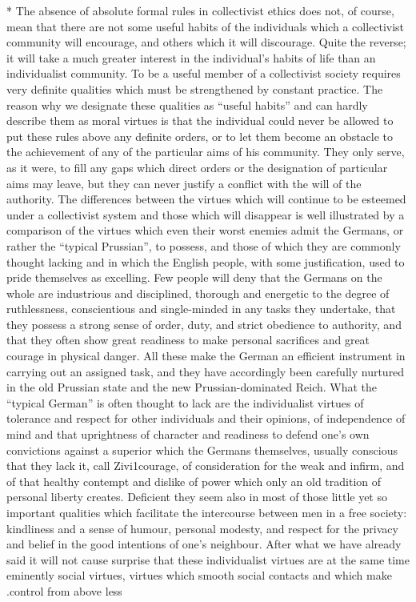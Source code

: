 \documentclass[11pt,openany]{book}
\begin{document}
\begin{center}\textasteriskcentered\hspace{0.9em}\textasteriskcentered\hspace{0.9em}\textasteriskcentered\end{center}

* The absence of absolute formal rules in collectivist ethics does not, of course, mean that there are not some useful habits of the individuals which a collectivist community will encourage, and others which it will discourage. Quite the reverse; it will take a much greater interest in the individual's habits of life than an individualist community. To be a useful member of a collectivist society requires very definite qualities which must be strengthened by constant practice. The reason why we designate these qualities as ``useful habits'' and can hardly describe them as moral virtues is that the individual could never be allowed to put these rules above any definite orders, or to let them become an obstacle to the achievement of any of the particular aims of his community. They only serve, as it were, to fill any gaps which direct orders or the designation of particular aims may leave, but they can never justify a conflict with the will of the authority. The differences between the virtues which will continue to be esteemed under a collectivist system and those which will disappear is well illustrated by a comparison of the virtues which even their worst enemies admit the Germans, or rather the ``typical Prussian'', to possess, and those of which they are commonly thought lacking and in which the English people, with some justification, used to pride themselves as excelling. Few people will deny that the Germans on the whole are industrious and disciplined, thorough and energetic to the degree of ruthlessness, conscientious and single-minded in any tasks they undertake, that they possess a strong sense of order, duty, and strict obedience to authority, and that they often show great readiness to make personal sacrifices and great courage in physical danger. All these make the German an efficient instrument in carrying out an assigned task, and they have accordingly been carefully nurtured in the old Prussian state and the new Prussian-dominated Reich. What the ``typical German'' is often thought to lack are the individualist virtues of tolerance and respect for other individuals and their opinions, of independence of mind and that uprightness of character and readiness to defend one's own convictions against a superior which the Germans themselves, usually conscious that they lack it, call Zivi1courage, of consideration for the weak and infirm, and of that healthy contempt and dislike of power which only an old tradition of personal liberty creates. Deficient they seem also in most of those little yet so important qualities which facilitate the intercourse between men in a free society: kindliness and a sense of humour, personal modesty, and respect for the privacy and belief in the good intentions of one's neighbour. After what we have already said it will not cause surprise that these individualist virtues are at the same time eminently social virtues, virtues which smooth social contacts and which make .control from above less 
\end{document}
